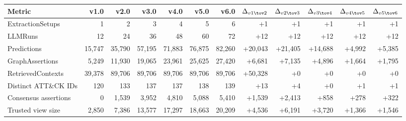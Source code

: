 \begin{tabular}{lrrrrrrrrrrr}
\toprule
Metric & v1.0 & v2.0 & v3.0 & v4.0 & v5.0 & v6.0 & $\Delta_{v1\tov2}$ & $\Delta_{v2\tov3}$ & $\Delta_{v3\tov4}$ & $\Delta_{v4\tov5}$ & $\Delta_{v5\tov6}$ \\
\midrule
ExtractionSetups & 1 & 2 & 3 & 4 & 5 & 6 & +1 & +1 & +1 & +1 & +1 \\
LLMRuns & 12 & 24 & 36 & 48 & 60 & 72 & +12 & +12 & +12 & +12 & +12 \\
Predictions & 15,747 & 35,790 & 57,195 & 71,883 & 76,875 & 82,260 & +20,043 & +21,405 & +14,688 & +4,992 & +5,385 \\
GraphAssertions & 5,249 & 11,930 & 19,065 & 23,961 & 25,625 & 27,420 & +6,681 & +7,135 & +4,896 & +1,664 & +1,795 \\
RetrievedContexts & 39,378 & 89,706 & 89,706 & 89,706 & 89,706 & 89,706 & +50,328 & +0 & +0 & +0 & +0 \\
Distinct ATT\&CK IDs & 120 & 133 & 137 & 137 & 138 & 139 & +13 & +4 & +0 & +1 & +1 \\
Consensus assertions & 0 & 1,539 & 3,952 & 4,810 & 5,088 & 5,410 & +1,539 & +2,413 & +858 & +278 & +322 \\
Trusted view size & 2,850 & 7,386 & 13,577 & 17,297 & 18,663 & 20,209 & +4,536 & +6,191 & +3,720 & +1,366 & +1,546 \\
\bottomrule
\end{tabular}